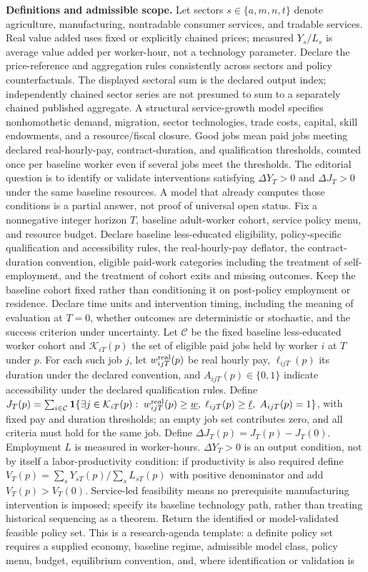 \documentclass[11pt,a4paper]{article}
\newcommand{\ind}{\mathbf 1}
\begin{document}
\textbf{Definitions and admissible scope.} Let sectors \(s\in\{a,m,n,t\}\) denote agriculture, manufacturing, nontradable consumer services, and tradable services. Real value added uses fixed or explicitly chained prices; measured \(Y_s/L_s\) is average value added per worker-hour, not a technology parameter. Declare the price-reference and aggregation rules consistently across sectors and policy counterfactuals. The displayed sectoral sum is the declared output index; independently chained sector series are not presumed to sum to a separately chained published aggregate. A structural service-growth model specifies nonhomothetic demand, migration, sector technologies, trade costs, capital, skill endowments, and a resource/fiscal closure. Good jobs mean paid jobs meeting declared real-hourly-pay, contract-duration, and qualification thresholds, counted once per baseline worker even if several jobs meet the thresholds. The editorial question is to identify or validate interventions satisfying \(\Delta Y_T>0\) and \(\Delta J_T>0\) under the same baseline resources. A model that already computes those conditions is a partial answer, not proof of universal open status. Fix a nonnegative integer horizon \(T\), baseline adult-worker cohort, service policy menu, and resource budget. Declare baseline less-educated eligibility, policy-specific qualification and accessibility rules, the real-hourly-pay deflator, the contract-duration convention, eligible paid-work categories including the treatment of self-employment, and the treatment of cohort exits and missing outcomes. Keep the baseline cohort fixed rather than conditioning it on post-policy employment or residence. Declare time units and intervention timing, including the meaning of evaluation at \(T=0\), whether outcomes are deterministic or stochastic, and the success criterion under uncertainty. Let \(\mathcal C\) be the fixed baseline less-educated worker cohort and \(\mathcal K_{iT}(p)\) the set of eligible paid jobs held by worker \(i\) at \(T\) under \(p\). For each such job \(j\), let \(w^{\rm real}_{ijT}(p)\) be real hourly pay, \(\ell_{ijT}(p)\) its duration under the declared convention, and \(A_{ijT}(p)\in\{0,1\}\) indicate accessibility under the declared qualification rules. Define \(J_T(p)=\sum_{i\in\mathcal C}\ind\{\exists j\in\mathcal K_{iT}(p):\;w^{\rm real}_{ijT}(p)\ge\underline w,\;\ell_{ijT}(p)\ge\underline\ell,\;A_{ijT}(p)=1\}\), with fixed pay and duration thresholds; an empty job set contributes zero, and all criteria must hold for the same job. Define \(\Delta J_T(p)=J_T(p)-J_T(0)\). Employment \(L\) is measured in worker-hours. \(\Delta Y_T>0\) is an output condition, not by itself a labor-productivity condition: if productivity is also required define \(V_T(p)=\sum_sY_{sT}(p)/\sum_sL_{sT}(p)\) with positive denominator and add \(V_T(p)>V_T(0)\). Service-led feasibility means no prerequisite manufacturing intervention is imposed; specify its baseline technology path, rather than treating historical sequencing as a theorem. Return the identified or model-validated feasible policy set. This is a research-agenda template: a definite policy set requires a supplied economy, baseline regime, admissible model class, policy menu, budget, equilibrium convention, and, where identification or validation is 
\end{document}

